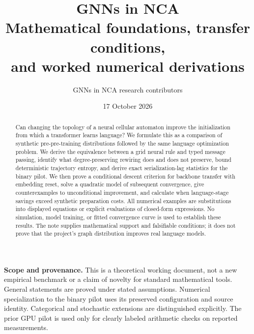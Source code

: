 \documentclass[11pt,a4paper]{article}
\title{GNNs in NCA\\[3pt]
\large Mathematical foundations, transfer conditions,\\
and worked numerical derivations}
\author{GNNs in NCA research contributors}
\date{17 October 2026}
\numberwithin{equation}{section}
\newcommand{\1}{\mathbf{1}}
\begin{document}
\maketitle
\begin{abstract}
Can changing the topology of a neural cellular automaton improve the
initialization from which a transformer learns language? We formulate this as
a comparison of synthetic pre-pre-training distributions followed by the same
language optimization problem. We derive the equivalence between a grid neural
rule and typed message passing, identify what degree-preserving rewiring does
and does not preserve, bound deterministic trajectory entropy, and derive
exact serialization-lag statistics for the binary pilot. We then prove a
conditional descent criterion for backbone transfer with embedding reset,
solve a quadratic model of subsequent convergence, give counterexamples to
unconditional improvement, and calculate when language-stage savings exceed
synthetic preparation costs. All numerical examples are substitutions into
displayed equations or explicit evaluations of closed-form expressions.
No simulation, model training, or fitted convergence curve is used to establish
these results. The note supplies mathematical support and falsifiable conditions;
it does not prove that the project's graph distribution improves real language
models.
\end{abstract}

\textbf{Scope and provenance.}
This is a theoretical working document, not a new empirical benchmark or a
claim of novelty for standard mathematical tools. General statements are
proved under stated assumptions. Numerical specialization to the binary
pilot uses its preserved configuration and source identity.
Categorical and stochastic extensions are distinguished explicitly.
The prior GPU pilot is used only for clearly labeled arithmetic checks on
reported measurements.

\newpage
\tableofcontents
\newpage







\end{document}
